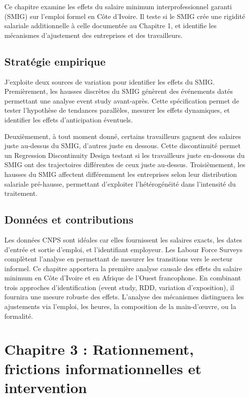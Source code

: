 \documentclass[12pt,a4paper]{article}
\begin{document}
Ce chapitre examine les effets du salaire minimum interprofessionnel garanti (SMIG) sur l'emploi formel en Côte d'Ivoire. Il teste si le SMIG crée une rigidité salariale additionnelle à celle documentée au Chapitre 1, et identifie les mécanismes d'ajustement des entreprises et des travailleurs.

\subsection{Stratégie empirique}

J'exploite deux sources de variation pour identifier les effets du SMIG. Premièrement, les hausses discrètes du SMIG génèrent des événements datés permettant une analyse event study avant-après. Cette spécification permet de tester l'hypothèse de tendances parallèles, mesurer les effets dynamiques, et identifier les effets d'anticipation éventuels.

Deuxièmement, à tout moment donné, certains travailleurs gagnent des salaires juste au-dessus du SMIG, d'autres juste en dessous. Cette discontinuité permet un Regression Discontinuity Design testant si les travailleurs juste en-dessous du SMIG ont des trajectoires différentes de ceux juste au-dessus. Troisièmement, les hausses du SMIG affectent différemment les entreprises selon leur distribution salariale pré-hausse, permettant d'exploiter l'hétérogénéité dans l'intensité du traitement.

\subsection{Données et contributions}

Les données CNPS sont idéales car elles fournissent les salaires exacts, les dates d'entrée et sortie d'emploi, et l'identifiant employeur. Les Labour Force Surveys complètent l'analyse en permettant de mesurer les transitions vers le secteur informel. Ce chapitre apportera la première analyse causale des effets du salaire minimum en Côte d'Ivoire et en Afrique de l'Ouest francophone. En combinant trois approches d'identification (event study, RDD, variation d'exposition), il fournira une mesure robuste des effets. L'analyse des mécanismes distinguera les ajustements via l'emploi, les heures, la composition de la main-d'œuvre, ou la formalité.

\section{Chapitre 3 : Rationnement, frictions informationnelles et intervention}
\end{document}

